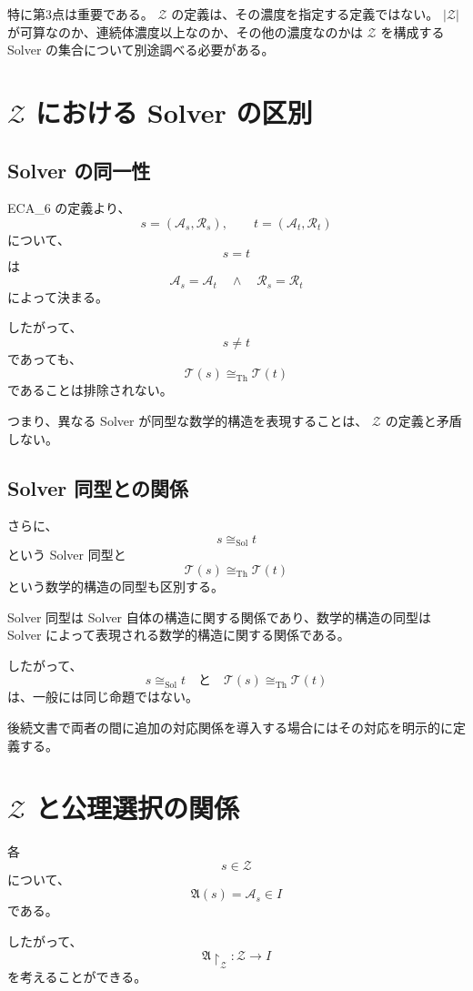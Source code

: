 \documentclass[a4paper,11pt]{article}
\begin{document}
特に第3点は重要である。
$\mathcal{Z}$ の定義は、その濃度を指定する定義ではない。
$|\mathcal{Z}|$ が可算なのか、連続体濃度以上なのか、その他の濃度なのかは $\mathcal{Z}$ を構成する Solver の集合について別途調べる必要がある。

\section{$\mathcal{Z}$ における Solver の区別}

\subsection{Solver の同一性}

ECA_6 の定義より、
\[
s=(\mathcal{A}_s,\mathcal{R}_s),
\qquad
t=(\mathcal{A}_t,\mathcal{R}_t)
\]
について、
\[
s=t
\]
は
\[
\mathcal{A}_s=\mathcal{A}_t
\quad\land\quad
\mathcal{R}_s=\mathcal{R}_t
\]
によって決まる。

したがって、
\[
s\neq t
\]
であっても、
\[
\mathcal{T}(s)\cong_{\mathrm{Th}}\mathcal{T}(t)
\]
であることは排除されない。

つまり、異なる Solver が同型な数学的構造を表現することは、
$\mathcal{Z}$ の定義と矛盾しない。

\subsection{Solver 同型との関係}

さらに、
\[
s\cong_{\mathrm{Sol}}t
\]
という Solver 同型と
\[
\mathcal{T}(s)\cong_{\mathrm{Th}}\mathcal{T}(t)
\]
という数学的構造の同型も区別する。

Solver 同型は Solver 自体の構造に関する関係であり、数学的構造の同型は Solver によって表現される数学的構造に関する関係である。

したがって、
\[
\boxed{
s\cong_{\mathrm{Sol}}t
\quad\text{と}\quad
\mathcal{T}(s)\cong_{\mathrm{Th}}\mathcal{T}(t)
}
\]
は、一般には同じ命題ではない。

後続文書で両者の間に追加の対応関係を導入する場合にはその対応を明示的に定義する。

\section{$\mathcal{Z}$ と公理選択の関係}

各
\[
s\in\mathcal{Z}
\]
について、
\[
\mathfrak{A}(s)=\mathcal{A}_s\in I
\]
である。

したがって、
\[
\mathfrak{A}\restriction_{\mathcal{Z}}
:
\mathcal{Z}\longrightarrow I
\]
を考えることができる。
\end{document}
